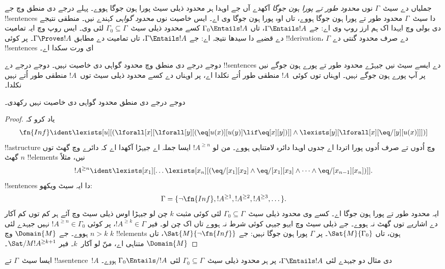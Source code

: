 \documentclass[../../../include/open-logic-section]{subfiles}
\begin{document}


\begin{explain}
جملیاں دے سیٹ~$\Gamma$ نوں \emph{محدود طور تے پورا ہون جوگا}
آکھدے آں جے اوہدا ہر محدود ذیلی سیٹ پورا ہون جوگا ہووے۔ پہلے درجے دی منطق
وچ جے !!{sentence}s دا سیٹ~$\Gamma$ محدود طور تے پورا ہون جوگا ہووے،
تاں اوہ پورا ہون جوگا وی اے۔ ایس خاصیت نوں \emph{محدود گواہی}
کہندے نیں۔ منطقی نتیجے دی بولی وچ ایہدا اک ہم ارز روپ وی اے: جے
$\Gamma \Entails !A$، تاں $\Gamma_0 \Entails !A$ کسے
محدود ذیلی سیٹ~$\Gamma_0 \subseteq \Gamma$ لئی وی۔ ایس روپ وچ
ایہ تمامیت دے قضیے دا سیدھا نتیجہ اے: جے $\Gamma \Entails !A$،
تاں تمامیت دے مطابق $\Gamma \Proves !A$۔ پر کوئی !!{derivation}،
$\Gamma$ دے صرف محدود گنتی دے !!{sentence}s ای ورت سکدا اے۔

دوجے درجے دی منطق وچ محدود گواہی دی خاصیت نہیں۔ دوجے درجے دے
!!{sentence}s دے ایسے سیٹ نیں جیہڑے محدود طور تے پورے ہون جوگے
نیں پر آپ پورے ہون جوگے نہیں۔ اوہناں توں کوئی~$!A$ منطقی طور
اُتے نکلدا اے، پر اوہناں دے کسے محدود ذیلی سیٹ توں~$!A$
منطقی طور اُتے نہیں نکلدا۔
\end{explain}

\begin{thm}
دوجے درجے دی منطق محدود گواہی دی خاصیت نہیں رکھدی۔
\end{thm}

\begin{proof}
یاد کرو کہ
\[
\fn{Inf} \ident \lexists[u][(\lforall[x][\lforall[y][(\eq[u(x)][u(y)]
      \lif \eq[x][y])]] \land \lexists[y][\lforall[x][\eq/[y][u(x)]]])]
\]
!!a{structure} وچ اُدوں تے صرف اُدوں پورا اتردا اے جدوں اوہدا
دائرہ لامتناہی ہووے۔ من لو $!A^{\ge n}$ ایسا جملہ اے جیہڑا
آکھدا اے کہ دائرے وچ گھٹ توں گھٹ $n$ !!{element}s نیں، مثلاً
\[
!A^{\ge n} \ident \lexists[x_1][\dots\lexists[x_n][(\eq/[x_1][x_2]
    \land \eq/[x_1][x_3] \land \dots \land \eq/[x_{n-1}][x_n])]].
\]
!!{sentence}s دا ایہ سیٹ ویکھو:
\[
\Gamma = \{\lnot \fn{Inf}, !A^{\ge 1}, !A^{\ge 2}, !A^{\ge 3}, \dots\}.
\]
ایہ محدود طور تے پورا ہون جوگا اے۔ کسے وی محدود ذیلی سیٹ~$\Gamma_0
\subseteq \Gamma$ لئی کوئی مثبت $k$ چن لو جیہڑا اوس ذیلی سیٹ وچ
آئے ہر کم توں کم آکار دے اشاریے توں گھٹ نہ ہووے۔ جے ذیلی سیٹ
وچ ایہو جیہی کوئی شرط نہ ہووے تاں اک چن لو۔ فیر $!A^{\ge k} \in \Gamma$،
پر کوئی
$!A^{\ge n} \in \Gamma_0$ نہیں جیہدے لئی $n>k$ ہووے۔
جے $\Domain{M}$ وچ $k$ !!{element}s ہون، تاں $\Sat{M}{\Gamma_0}$۔
پر $\Gamma$ پورا ہون جوگا نہیں: جے $\Sat{M}{\lnot \fn{Inf}}$،
تاں $\Domain{M}$ متناہی اے، منّ لو آکار~$k$۔ فیر
$\Sat/{M}{!A^{\ge k+1}}$۔
\end{proof}

\begin{prob}
ایسا سیٹ~$\Gamma$ تے !!a{sentence}~$!A$ دی مثال دو جیہدے لئی
$\Gamma \Entails !A$، پر ہر محدود ذیلی سیٹ~$\Gamma_0 \subseteq
\Gamma$ لئی $\Gamma_0 \Entails/ !A$ ہووے۔
\end{prob}
\end{document}
